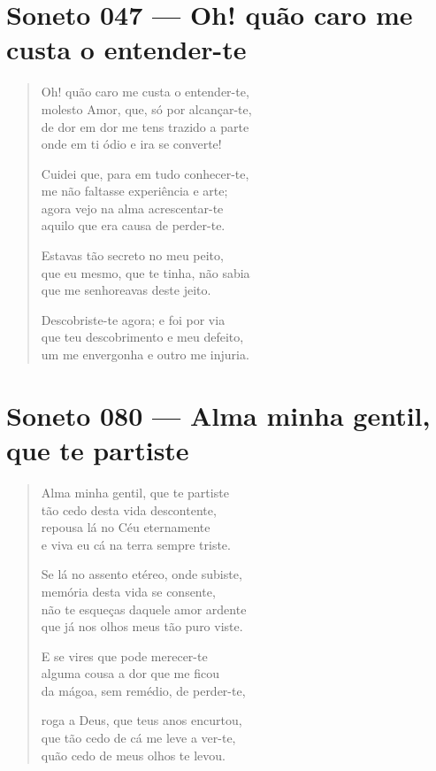 \documentclass[10pt,a5paper,oneside]{book}
\begin{document}
\chapter{Soneto 047 --- Oh! quão caro me custa o entender-te}

\begin{verse}
Oh! quão caro me custa o entender-te,\\
molesto Amor, que, só por alcançar-te,\\
de dor em dor me tens trazido a parte\\
onde em ti ódio e ira se converte!

Cuidei que, para em tudo conhecer-te,\\
me não faltasse experiência e arte;\\
agora vejo na alma acrescentar-te\\
aquilo que era causa de perder-te.

Estavas tão secreto no meu peito,\\
que eu mesmo, que te tinha, não sabia\\
que me senhoreavas deste jeito.

Descobriste-te agora; e foi por via\\
que teu descobrimento e meu defeito,\\
um me envergonha e outro me injuria.
\end{verse}

\chapter{Soneto 080 --- Alma minha gentil, que te partiste}

\begin{verse}
Alma minha gentil, que te partiste\\
tão cedo desta vida descontente,\\
repousa lá no Céu eternamente\\
e viva eu cá na terra sempre triste.

Se lá no assento etéreo, onde subiste,\\
memória desta vida se consente,\\
não te esqueças daquele amor ardente\\
que já nos olhos meus tão puro viste.

E se vires que pode merecer-te\\
alguma cousa a dor que me ficou\\
da mágoa, sem remédio, de perder-te,

roga a Deus, que teus anos encurtou,\\
que tão cedo de cá me leve a ver-te,\\
quão cedo de meus olhos te levou.
\end{verse}
\end{document}
